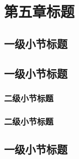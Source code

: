 \chapter{第五章标题}

\section{一级小节标题}


\section{一级小节标题}

\subsection{二级小节标题}


\subsection{二级小节标题}


\section{一级小节标题}

